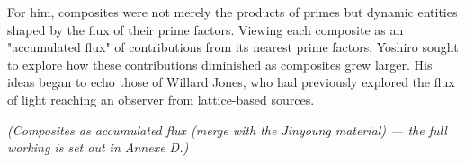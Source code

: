 For him, composites were not merely the products of primes but dynamic entities shaped by the flux of their prime factors. Viewing each composite as an "accumulated flux" of contributions from its nearest prime factors, Yoshiro sought to explore how these contributions diminished as composites grew larger. His ideas began to echo those of Willard Jones, who had previously explored the flux of light reaching an observer from lattice-based sources.

\textit{(Composites as accumulated flux (merge with the Jinyoung material) --- the full working is set out in Annexe D.)}

% 
% 
% 
